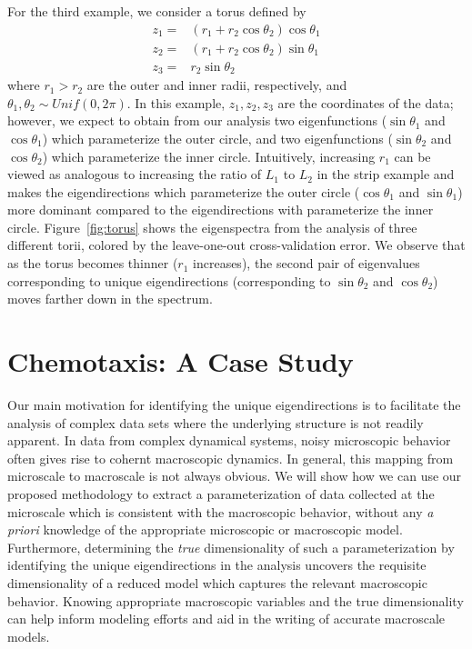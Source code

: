 \documentclass[3p]{elsarticle}
\begin{document}
For the third example, we consider a torus defined by
%
\begin{equation}
\begin{aligned}
z_1 =& (r_1 + r_2 \cos \theta_2 ) \cos \theta_1 \\
z_2 =& (r_1 + r_2 \cos \theta_2 ) \sin \theta_1 \\
z_3 =& r_2 \sin \theta_2
\end{aligned}
\label{eq:torus}
\end{equation}
%
where $r_1 > r_2$ are the outer and inner radii, respectively, and $\theta_1, \theta_2 \sim Unif(0, 2 \pi)$. 
%
In this example, $z_1, z_2, z_3$ are the coordinates of the data; however, we expect to obtain from our analysis two eigenfunctions ($\sin \theta_1$ and $\cos \theta_1$) which parameterize the outer circle, and two eigenfunctions ($\sin \theta_2$ and $\cos \theta_2$) which parameterize the inner circle. 
%
Intuitively, increasing $r_1$ can be viewed as analogous to increasing the ratio of $L_1$ to $L_2$ in the strip example and makes the eigendirections which parameterize the outer circle ($\cos \theta_1$ and $\sin \theta_1$) more dominant compared to the eigendirections with parameterize the inner circle.
%
Figure~\ref{fig:torus} shows the eigenspectra from the analysis of three different torii, colored by the leave-one-out cross-validation error. 
%
We observe that as the torus becomes thinner ($r_1$ increases), the second pair of eigenvalues corresponding to unique eigendirections (corresponding to $\sin \theta_2$ and $\cos \theta_2$) moves farther down in the spectrum. 

\section{Chemotaxis: A Case Study}

Our main motivation for identifying the unique eigendirections is to facilitate the analysis of complex data sets where the underlying structure is not readily apparent. 
%
In data from complex dynamical systems, noisy microscopic behavior often gives rise to cohernt macroscopic dynamics. 
%
In general, this mapping from microscale to macroscale is not always obvious.
%
We will show how we can use our proposed methodology to extract a parameterization of data collected at the microscale which is consistent with the macroscopic behavior, without any {\em a priori} knowledge of the appropriate microscopic or macroscopic model.
%
Furthermore, determining the {\em true} dimensionality of such a parameterization by identifying the unique eigendirections in the analysis uncovers the requisite dimensionality of a reduced model which captures the relevant macroscopic behavior. 
%
Knowing appropriate macroscopic variables and the true dimensionality can help inform modeling efforts and aid in the writing of accurate macroscale models.
\end{document}
